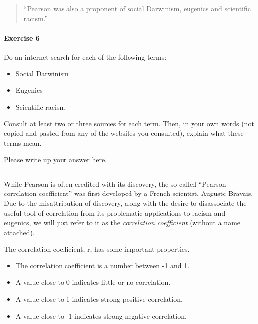 \documentclass[
]{book}
\providecommand{\tightlist}{%
  \setlength{\itemsep}{0pt}\setlength{\parskip}{0pt}}
\begin{document}
\begin{quote}
``Pearson was also a proponent of social Darwinism, eugenics and scientific racism.''
\end{quote}

\hypertarget{exercise-6-1}{%
\paragraph*{Exercise 6}\label{exercise-6-1}}

Do an internet search for each of the following terms:

\begin{itemize}
\tightlist
\item
  Social Darwinism
\item
  Eugenics
\item
  Scientific racism
\end{itemize}

Consult at least two or three sources for each term. Then, in your own words (not copied and pasted from any of the websites you consulted), explain what these terms mean.

Please write up your answer here.

\begin{center}\rule{0.5\linewidth}{0.5pt}\end{center}

While Pearson is often credited with its discovery, the so-called ``Pearson correlation coefficient'' was first developed by a French scientist, Auguste Bravais. Due to the misattribution of discovery, along with the desire to disassociate the useful tool of correlation from its problematic applications to racism and eugenics, we will just refer to it as the \emph{correlation coefficient} (without a name attached).

The correlation coefficient, r, has some important properties.

\begin{itemize}
\tightlist
\item
  The correlation coefficient is a number between -1 and 1.
\item
  A value close to 0 indicates little or no correlation.
\item
  A value close to 1 indicates strong positive correlation.
\item
  A value close to -1 indicates strong negative correlation.
\end{itemize}
\end{document}
